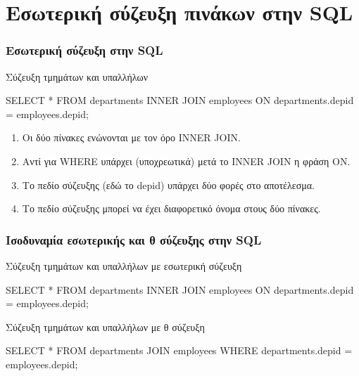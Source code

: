 \section[]{\textgreek{Εσωτερική σύζευξη πινάκων στην \textlatin{SQL}}}


\begin{frame}
\frametitle{Εσωτερική σύζευξη στην {\en SQL}}
\begin{minipage}{0.92\textwidth}
\begin{exampleblock}{Σύζευξη τμημάτων και υπαλλήλων}
\en
\begin{SQL}
  SELECT *
    FROM departments INNER JOIN employees
         ON departments.depid = employees.depid;
\end{SQL}
\el
\end{exampleblock}
\pause
\begin{enumerate}[<+->] \pause \itemsep 6pt
  \item Οι δύο πίνακες ενώνονται με τον όρο {\sq INNER JOIN}.
  \item Αντί για {\sq WHERE} υπάρχει ({\bb \el υποχρεωτικά}) μετά το {\sq INNER JOIN}
        η φράση {\sq ON}.
  \item Το πεδίο σύζευξης (εδώ το {\ra depid}) υπάρχει δύο φορές στο αποτέλεσμα.  
  \item Το πεδίο σύζευξης μπορεί να έχει διαφορετικό όνομα στους δύο πίνακες.       
\end{enumerate}
\end{minipage}
\end{frame}


\begin{frame}
\frametitle{Ισοδυναμία εσωτερικής και θ σύζευξης στην {\en SQL}}
\begin{minipage}{0.92\textwidth}
\begin{block}{\small Σύζευξη τμημάτων και υπαλλήλων με εσωτερική σύζευξη}
\en
\begin{SQL}
  SELECT *
    FROM departments INNER JOIN employees
         ON departments.depid = employees.depid;
\end{SQL}
\el
\end{block}
\begin{block}{\small Σύζευξη τμημάτων και υπαλλήλων με θ σύζευξη}
\en
\begin{SQL}
  SELECT *
    FROM departments JOIN employees
   WHERE departments.depid = employees.depid;
\end{SQL}
\el
\end{block}
\end{minipage}
\end{frame}

